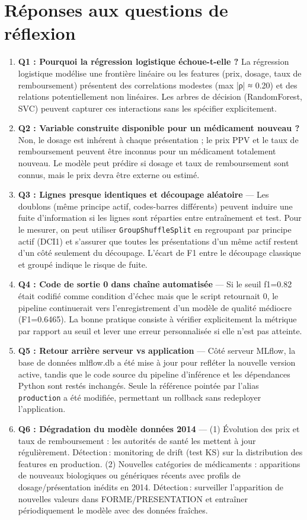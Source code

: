 \documentclass[12pt,a4paper]{report}
\begin{document}
\chapter*{Réponses aux questions de réflexion}
\begin{enumerate}
    \item \textbf{Q1 : Pourquoi la régression logistique échoue-t-elle ?} La régression logistique modélise une frontière linéaire ou les features (prix, dosage, taux de remboursement) présentent des correlations modestes (max |ρ| ≈ 0.20) et des relations potentiellement non linéaires. Les arbres de décision (RandomForest, SVC) peuvent capturer ces interactions sans les spécifier explicitement.
    \item \textbf{Q2 : Variable construite disponible pour un médicament nouveau ?} Non, le dosage est inhérent à chaque présentation ; le prix PPV et le taux de remboursement peuvent être inconnus pour un médicament totalement nouveau. Le modèle peut prédire si dosage et taux de remboursement sont connus, mais le prix devra être externe ou estimé.
    \item \textbf{Q3 : Lignes presque identiques et découpage aléatoire} — Les doublons (même principe actif, codes-barres différents) peuvent induire une fuite d'information si les lignes sont réparties entre entraînement et test. Pour le mesurer, on peut utiliser \texttt{GroupShuffleSplit} en regroupant par principe actif (DCI1) et s'assurer que toutes les présentations d'un même actif restent d'un côté seulement du découpage. L'écart de F1 entre le découpage classique et groupé indique le risque de fuite.
    \item \textbf{Q4 : Code de sortie 0 dans chaîne automatisée} — Si le seuil f1=0.82 était codifié comme condition d'échec mais que le script retournait 0, le pipeline continuerait vers l'enregistrement d'un modèle de qualité médiocre (F1=0.6465). La bonne pratique consiste à vérifier explicitement la métrique par rapport au seuil et lever une erreur personnalisée si elle n'est pas atteinte.
    \item \textbf{Q5 : Retour arrière serveur vs application} — Côté serveur MLflow, la base de données mlflow.db a été mise à jour pour refléter la nouvelle version active, tandis que le code source du pipeline d'inférence et les dépendances Python sont restés inchangés. Seule la référence pointée par l'alias \texttt{production} a été modifiée, permettant un rollback sans redeployer l'application.
    \item \textbf{Q6 : Dégradation du modèle données 2014} — (1) Évolution des prix et taux de remboursement : les autorités de santé les mettent à jour régulièrement. Détection : monitoring de drift (test KS) sur la distribution des features en production. (2) Nouvelles catégories de médicaments : apparitions de nouveaux biologiques ou génériques récents avec profils de dosage/présentation inédits en 2014. Détection : surveiller l'apparition de nouvelles valeurs dans FORME/PRESENTATION et entraîner périodiquement le modèle avec des données fraîches.
\end{enumerate}
\end{document}
